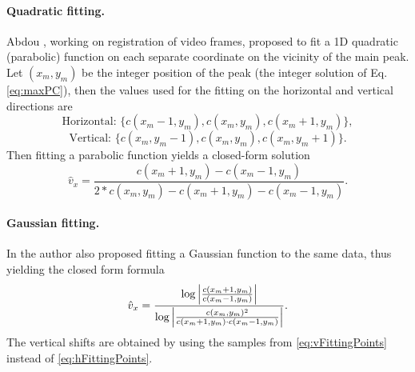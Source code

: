 \paragraph{Quadratic fitting.} 
Abdou \cite{Abdou1998}, working on registration of video frames, proposed to fit a 1D quadratic (parabolic) function on each separate coordinate on the vicinity of the main peak. Let $(x_m,y_m)$ be the integer position of the peak (the integer solution of Eq. \eqref{eq:maxPC}), then the values used for the fitting on the horizontal and vertical directions are
\begin{equation}
\label{eq:hFittingPoints}
\text{Horizontal: } \{c(x_m-1,y_m), c(x_m,y_m), c(x_m+1,y_m)\},
\end{equation}
\begin{equation}
\label{eq:vFittingPoints}
\text{Vertical: }\{c(x_m,y_m-1), c(x_m,y_m), c(x_m,y_m+1)\}.
\end{equation}
Then fitting a parabolic function yields a closed-form solution 
\begin{equation}
\hat{v}_x = \frac{c(x_m+1,y_m) - c(x_m-1,y_m)}{2*c(x_m,y_m) - c(x_m+1,y_m) - c(x_m-1,y_m)}.
\label{eq:quadraticFitting}
\end{equation}
\paragraph{Gaussian fitting.} In \cite{Abdou1998} the author also proposed fitting a Gaussian function to the same data, thus yielding the closed form formula 
\begin{equation}
\hat{v}_x = \frac{\log\left\lvert\frac{c(x_m+1,y_m)}{c(x_m-1,y_m)}\right\rvert}{\log\left\lvert\frac{c(x_m,y_m)^2}{c(x_m+1,y_m) \cdot c(x_m-1,y_m)}\right\rvert}.
\end{equation}
The vertical shifts are obtained by using the samples from \eqref{eq:vFittingPoints} instead of \eqref{eq:hFittingPoints}.

